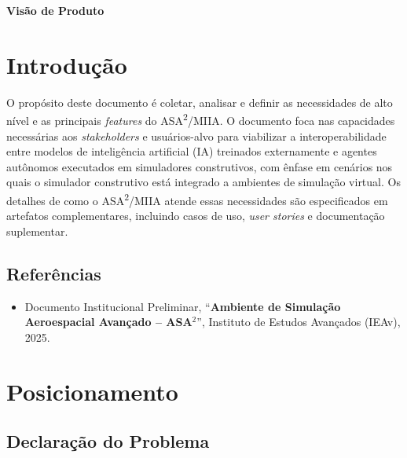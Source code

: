 \begin{center}
    \textbf{\Huge{Visão de Produto}}
\end{center}

\section{Introdução}

O propósito deste documento é coletar, analisar e definir as necessidades de alto nível e as principais \emph{features} do ASA\textsuperscript{2}/MIIA. O documento foca nas capacidades necessárias aos \emph{stakeholders} e usuários-alvo para viabilizar a interoperabilidade entre modelos de inteligência artificial (IA) treinados externamente e agentes autônomos executados em simuladores construtivos, com ênfase em cenários nos quais o simulador construtivo está integrado a ambientes de simulação virtual. Os detalhes de como o ASA\textsuperscript{2}/MIIA atende essas necessidades são especificados em artefatos complementares, incluindo casos de uso, \emph{user stories} e documentação suplementar.

\subsection{Referências}

\begin{itemize}
    \item Documento Institucional Preliminar, ``\textbf{Ambiente de Simulação Aeroespacial Avançado -- ASA$^{2}$}'', Instituto de Estudos Avançados (IEAv), 2025.
\end{itemize}

\newpage

\section{Posicionamento}

\subsection{Declaração do Problema}

